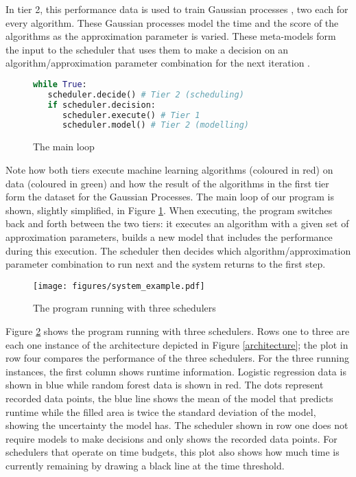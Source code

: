 \documentclass[a4paper,12pt,twoside,openright]{report}
\begin{document}
In tier 2, this performance data is used to train Gaussian processes \raisebox{.5pt}{\textcircled{\raisebox{-.9pt} {4}}}, two each for every algorithm. These Gaussian processes model the time and the score of the algorithms as the approximation parameter is varied. These meta-models form the input to the scheduler \raisebox{.5pt}{\textcircled{\raisebox{-.9pt} {5}}} that uses them to make a decision on an algorithm/approximation parameter combination for the next iteration \raisebox{.5pt}{\textcircled{\raisebox{-.9pt} {6}}}.

\begin{figure}[ht]
\begin{lstlisting}[language=Python]
while True:
   scheduler.decide() # Tier 2 (scheduling)
   if scheduler.decision:
      scheduler.execute() # Tier 1
      scheduler.model() # Tier 2 (modelling)
\end{lstlisting}
\caption{The main loop}
\label{mainloop}
\end{figure}


Note how both tiers execute machine learning algorithms (coloured in red) on data (coloured in green) and how the result of the algorithms in the first tier form the dataset for the Gaussian Processes. The main loop of our program is shown, slightly simplified, in Figure \ref{mainloop}. When executing, the program switches back and forth between the two tiers: it executes an algorithm with a given set of approximation parameters, builds a new model that includes the performance during this execution. The scheduler then decides which algorithm/approximation parameter combination to run next and the system returns to the first step.

\begin{figure}[p]
    \centerline{\texttt{[image: figures/system\_example.pdf]}}
  \caption{The program running with three schedulers}
    \label{systemexample}
\end{figure}

Figure \ref{systemexample} shows the program running with three schedulers. Rows one to three are each one instance of the architecture depicted in Figure \ref{architecture}; the plot in row four compares the performance of the three schedulers. For the three running instances, the first column shows runtime information. Logistic regression data is shown in blue while random forest data is shown in red. The dots represent recorded data points, the blue line shows the mean of the model that predicts runtime while the filled area is twice the standard deviation of the model, showing the uncertainty the model has. The scheduler shown in row one does not require models to make decisions and only shows the recorded data points. For schedulers that operate on time budgets, this plot also shows how much time is currently remaining by drawing a black line at the time threshold.
\end{document}
